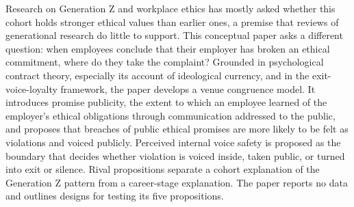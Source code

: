 Research on Generation Z and workplace ethics has mostly asked whether this cohort holds stronger ethical values than earlier ones, a premise that reviews of generational research do little to support. This conceptual paper asks a different question: when employees conclude that their employer has broken an ethical commitment, where do they take the complaint? Grounded in psychological contract theory, especially its account of ideological currency, and in the exit-voice-loyalty framework, the paper develops a venue congruence model. It introduces promise publicity, the extent to which an employee learned of the employer's ethical obligations through communication addressed to the public, and proposes that breaches of public ethical promises are more likely to be felt as violations and voiced publicly. Perceived internal voice safety is proposed as the boundary that decides whether violation is voiced inside, taken public, or turned into exit or silence. Rival propositions separate a cohort explanation of the Generation Z pattern from a career-stage explanation. The paper reports no data and outlines designs for testing its five propositions.
